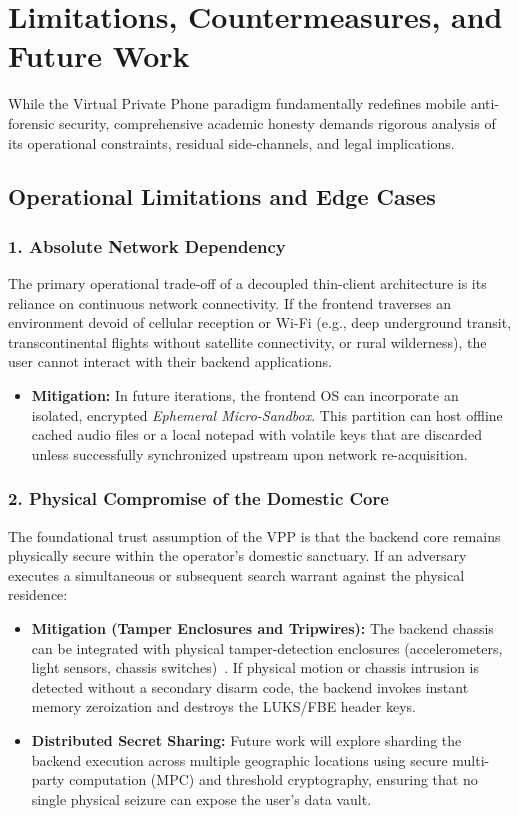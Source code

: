 \section{Limitations, Countermeasures, and Future Work}
\label{sec:limitations}

While the Virtual Private Phone paradigm fundamentally redefines mobile anti-forensic security, comprehensive academic honesty demands rigorous analysis of its operational constraints, residual side-channels, and legal implications.

\subsection{Operational Limitations and Edge Cases}

\subsubsection{1. Absolute Network Dependency}
The primary operational trade-off of a decoupled thin-client architecture is its reliance on continuous network connectivity. If the frontend traverses an environment devoid of cellular reception or Wi-Fi (e.g., deep underground transit, transcontinental flights without satellite connectivity, or rural wilderness), the user cannot interact with their backend applications.
\begin{itemize}
    \item \textbf{Mitigation:} In future iterations, the frontend OS can incorporate an isolated, encrypted \textit{Ephemeral Micro-Sandbox}. This partition can host offline cached audio files or a local notepad with volatile keys that are discarded unless successfully synchronized upstream upon network re-acquisition.
\end{itemize}

\subsubsection{2. Physical Compromise of the Domestic Core}
The foundational trust assumption of the VPP is that the backend core remains physically secure within the operator's domestic sanctuary. If an adversary executes a simultaneous or subsequent search warrant against the physical residence:
\begin{itemize}
    \item \textbf{Mitigation (Tamper Enclosures and Tripwires):} The backend chassis can be integrated with physical tamper-detection enclosures (accelerometers, light sensors, chassis switches)~\cite{anderson2001tamper}. If physical motion or chassis intrusion is detected without a secondary disarm code, the backend invokes instant memory zeroization and destroys the LUKS/FBE header keys.
    \item \textbf{Distributed Secret Sharing:} Future work will explore sharding the backend execution across multiple geographic locations using secure multi-party computation (MPC) and threshold cryptography, ensuring that no single physical seizure can expose the user's data vault.
\end{itemize}

